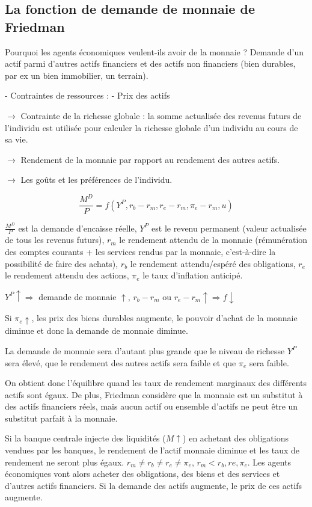 	\subsection{La fonction de demande de monnaie de Friedman}
	
	Pourquoi les agents économiques veulent-ils avoir de la monnaie ? Demande d'un actif parmi d'autres actifs financiers et des actifs non financiers (bien durables, par ex un bien immobilier, un terrain).
	
	- Contraintes de ressources : 
	- Prix des actifs
	
	$\rightarrow$ Contrainte de la richesse globale : la somme actualisée des revenus futurs de l'individu est utilisée pour calculer la richesse globale d'un individu au cours de sa vie.
	
	$\rightarrow$ Rendement de la monnaie par rapport au rendement des autres actifs.
	
	$\rightarrow$ Les goûts et les préférences de l'individu.
	
	$$\frac{M^D}{P} = f(Y^P, r_b - r_m, r_e - r_m,\pi_e - r_m, u)$$
	
	$\frac{M^D}{P}$ est la demande d'encaisse réelle, $Y^P$ est le revenu permanent (valeur actualisée de tous les revenus futurs), $r_m$ le rendement attendu de la monnaie (rémunération des comptes courants + les services rendus par la monnaie, c'est-à-dire la possibilité de faire des achats), $r_b$ le rendement attendu/espéré des obligations, $r_e$ le rendement attendu des actions, $\pi_e$ le taux d'inflation anticipé.
	
	$Y^P \uparrow \Rightarrow$ demande de monnaie $\uparrow$, $r_b - r_m$ ou $r_e - r_m \uparrow \Rightarrow f \downarrow$
	
	Si $\pi_e \uparrow$, les prix des biens durables augmente, le pouvoir d'achat de la monnaie diminue et donc la demande de monnaie diminue.
	
	La demande de monnaie sera d'autant plus grande que le niveau de richesse $Y^P$ sera élevé, que le rendement des autres actifs sera faible et que $\pi_e$ sera faible. 
	
	On obtient donc l'équilibre quand les taux de rendement marginaux des différents actifs sont égaux. De plus, Friedman considère que la monnaie est un substitut à des actifs financiers réels, mais aucun actif ou ensemble d'actifs ne peut être un substitut parfait à la monnaie.
	
	Si la banque centrale injecte des liquidités ($M \uparrow$) en achetant des obligations vendues par les banques, le rendement de l'actif monnaie diminue et les taux de rendement ne seront plus égaux. $r_m \neq r_b \neq r_e \neq \pi_e$, $r_m < r_b, re, \pi_e$. Les agents économiques vont alors acheter des obligations, des biens et des services et d'autres actifs financiers. Si la demande des actifs augmente, le prix de ces actifs augmente.


